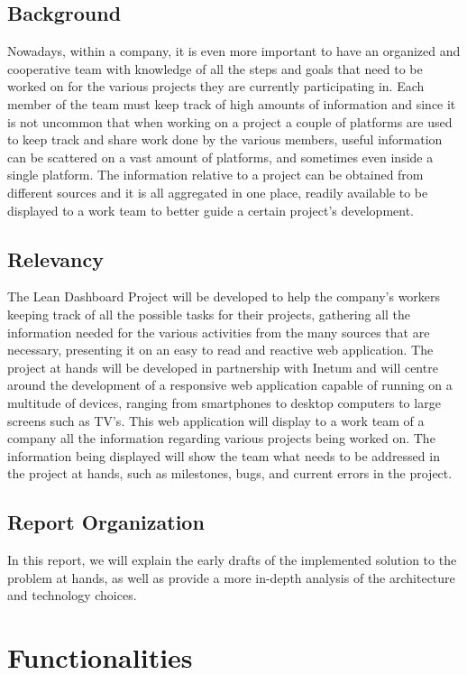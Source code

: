 \documentclass[a4paper,twoside,10pt]{report}
\begin{document}
\section{Background}
Nowadays, within a company, it is even more important to have an organized and cooperative team with knowledge of all the steps and goals that need to be worked on for the various projects they are currently participating in.
Each member of the team must keep track of high amounts of information and since it is not uncommon that when working on a project a couple of platforms are used to keep track and share work done by the various members, useful information can be scattered on a vast amount of platforms, and sometimes even inside a single platform.
The information relative to a project can be obtained from different sources and it is all aggregated in one place, readily available to be displayed to a work team to better guide a certain project's development.

\section{Relevancy}
The Lean Dashboard Project will be developed to help the company's workers keeping track of all the possible tasks for their projects, gathering all the information needed for the various activities from the many sources that are necessary, presenting it on an easy to read and reactive web application.
The project at hands will be developed in partnership with Inetum\cite{INETUM} and will centre around the development of a responsive web application capable of running on a multitude of devices, ranging from smartphones to desktop computers to large screens such as TV’s. This web application will display to a work team of a company all the information regarding various projects being worked on. 
The information being displayed will show the team what needs to be addressed in the project at hands, such as milestones, bugs, and current errors in the project.

\section{Report Organization}
In this report, we will explain the early drafts of the implemented solution to the problem at hands, as well as provide a more in-depth analysis of the architecture and technology choices.

\chapter{Functionalities}
\end{document}

